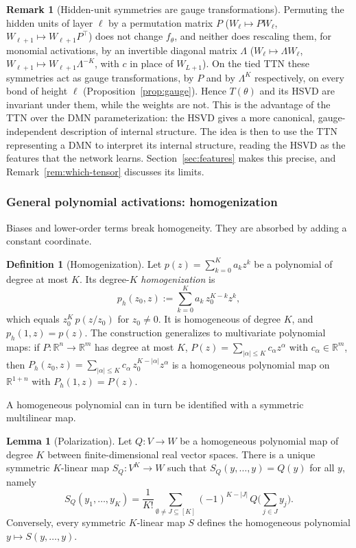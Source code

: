 \documentclass[11pt]{article}
\newcommand{\R}{\mathbb{R}}
\theoremstyle{definition}
\newtheorem{lemma}[theorem]{Lemma}
\newtheorem{definition}[theorem]{Definition}
\newtheorem{remark}[theorem]{Remark}
\numberwithin{equation}{section}
\begin{document}
\begin{remark}[Hidden-unit symmetries are gauge transformations]\label{rem:symmetries}
Permuting the hidden units of layer $\ell$ by a permutation matrix $P$ ($W_\ell\mapsto PW_\ell$, $W_{\ell+1}\mapsto W_{\ell+1}P^\top$) does not change $f_\theta$, and neither does rescaling them, for monomial activations, by an invertible diagonal matrix $\Lambda$ ($W_\ell\mapsto\Lambda W_\ell$, $W_{\ell+1}\mapsto W_{\ell+1}\Lambda^{-K}$, with $c$ in place of $W_{L+1}$). On the tied TTN these symmetries act as gauge transformations, by $P$ and by $\Lambda^K$ respectively, on every bond of height $\ell$ (Proposition~\ref{prop:gauge}). Hence $T(\theta)$ and its HSVD are invariant under them, while the weights are not. This is the advantage of the TTN over the DMN parameterization: the HSVD gives a more canonical, gauge-independent description of internal structure. The idea is then to use the TTN representing a DMN to interpret its internal structure, reading the HSVD as the features that the network learns. Section~\ref{sec:features} makes this precise, and Remark~\ref{rem:which-tensor} discusses its limits.
\end{remark}

\subsubsection{General polynomial activations: homogenization}

Biases and lower-order terms break homogeneity. They are absorbed by adding a constant coordinate.

\begin{definition}[Homogenization]
Let $p(z)=\sum_{k=0}^Ka_kz^k$ be a polynomial of degree at most $K$. Its degree-$K$ \emph{homogenization} is
\[
p_h(z_0,z):=\sum_{k=0}^Ka_k\,z_0^{K-k}z^k,
\]
which equals $z_0^K\,p(z/z_0)$ for $z_0\neq0$. It is homogeneous of degree $K$, and $p_h(1,z)=p(z)$. The construction generalizes to multivariate polynomial maps: if $P:\R^n\to\R^m$ has degree at most $K$, $P(z)=\sum_{|\alpha|\le K}c_\alpha z^\alpha$ with $c_\alpha\in\R^m$, then $P_h(z_0,z)=\sum_{|\alpha|\le K}c_\alpha\,z_0^{K-|\alpha|}z^\alpha$ is a homogeneous polynomial map on $\R^{1+n}$ with $P_h(1,z)=P(z)$.
\end{definition}

A homogeneous polynomial can in turn be identified with a symmetric multilinear map.

\begin{lemma}[Polarization]\label{lem:polarization}
Let $Q:V\to W$ be a homogeneous polynomial map of degree $K$ between finite-dimensional real vector spaces. There is a unique symmetric $K$-linear map $S_Q:V^K\to W$ such that $S_Q(y,\dots,y)=Q(y)$ for all $y$, namely
\[
S_Q(y_1,\dots,y_K)=\frac1{K!}\sum_{\emptyset\neq J\subseteq[K]}(-1)^{K-|J|}\,Q\Big(\sum_{j\in J}y_j\Big).
\]
Conversely, every symmetric $K$-linear map $S$ defines the homogeneous polynomial $y\mapsto S(y,\dots,y)$.
\end{lemma}
\end{document}
